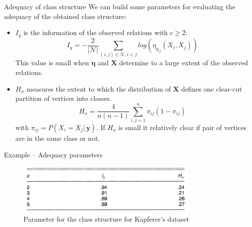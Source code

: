 \documentclass[aspectratio=169,xcolor=dvipsnames]{beamer}
\newcommand{\setn}{\mathcal{N}}
\newcommand{\vecy}{\textbf{y}}
\newcommand{\matx}{\textbf{X}}
\newcommand{\veceta}{\boldsymbol{\eta}}
\begin{document}
\begin{frame}{Adequacy of class structure}
We can build some parameters for evaluating the adequacy of the obtained class structure:
 
\begin{itemize}
    \item $I_y$ is the information of the observed relations with $c \geq 2$:
    $$
    I_y = -\frac{2}{|\setn|}\sum_{(i,j)\in\setn, i<j} log(\eta_{y_{ij}}(X_i, X_j))
    $$
    This value is small when $\veceta$ and $\matx$ determine to a large extent of the observed relations.
    \vspace{5pt}
    \item $H_x$ measures the extent to which the distribution of $\matx$ defines one clear-cut partition of vertices into classes.
    $$
    H_x = \frac{4}{n(n-1)}\sum_{i,j = 1}^n \pi_{ij}(1-\pi_{ij})
    $$
    with $\pi_{ij} = P(X_i=X_j|\,\vecy)$. If $H_x$ is small it relatively clear if pair of vertices are in the same class or not.
\end{itemize}
\end{frame}
\begin{frame}{Example – Adequacy parameters}

\begin{figure}
    \centering
    \includegraphics[keepaspectratio, height = 2.5cm]{utilities/adequacy_parameter.png}
    \caption{Parameter for the class structure for Kapferer's dataset}
    \label{fig:11}
\end{figure}
    
\end{frame}
\end{document}
